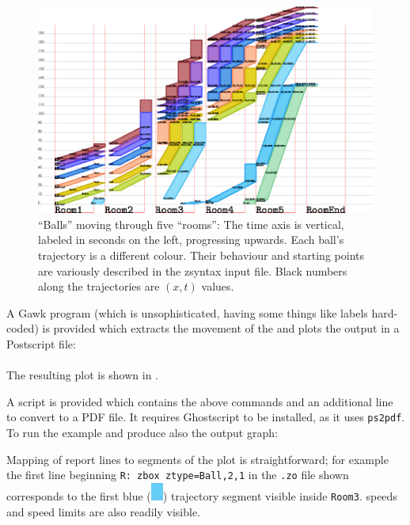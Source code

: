 \begin{figure}[ht]
  \centering
  \includegraphics[angle=0,width=16cm]{50_figs/__Testing_Pipe_Zboxen.eps}
  \caption{``Balls'' moving through five ``rooms'': The time axis is
    vertical, labeled in seconds on the left, progressing upwards.
    Each ball's trajectory is a different colour. Their behaviour and
    starting points are variously described in the zsyntax input
    file. Black numbers along the trajectories are $(x,t)$ values.}
  \label{fig:balls}
\end{figure}

A Gawk program (which is unsophisticated, having some things like
labels hard-coded) is provided which extracts the movement of the
 and plots the output in a Postscript file:\\
\\
The resulting plot is shown in .

A script is provided which contains the
above commands and an additional line to convert to a PDF file.
It requires Ghostscript to be installed, as it uses {\tt ps2pdf}.
To run the example and produce also the output graph:\\

Mapping of report lines to segments of the plot is straightforward; for example
the first line beginning {\tt R: zbox ztype=Ball,2,1} in the {\tt .zo} file shown
corresponds to the first blue (\includegraphics[angle=90,width=0.4cm]{50_figs/_Blue.eps})
trajectory segment visible inside {\tt Room3}.  speeds and speed limits
are also readily visible.

